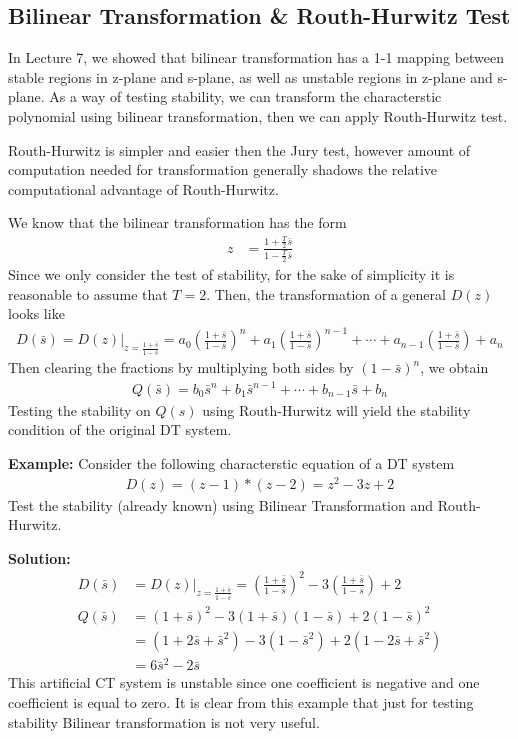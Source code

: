 \documentclass[twoside]{article}
\begin{document}
\subsection*{Bilinear Transformation \& Routh-Hurwitz Test}

In Lecture 7, we showed that bilinear transformation has a 1-1 
mapping between stable regions in z-plane and s-plane, as well as
unstable regions in z-plane and s-plane. As a way of testing
stability, we can transform the characterstic polynomial 
using bilinear transformation, then we can apply Routh-Hurwitz
test. 

Routh-Hurwitz is simpler and easier then the Jury test,
however amount of computation needed for transformation
generally shadows the relative computational advantage of 
Routh-Hurwitz.

We know that the bilinear transformation has the form
%
\begin{align*}
 z &= \frac{1+\frac{T}{2} \bar{s}}{1-\frac{T}{2} \bar{s}}
\end{align*}
%
Since we only consider the test of stability, for the sake of
simplicity it is reasonable to assume that $T = 2$. Then, the
transformation of a general $D(z)$ looks like
%
%
\begin{align*}
D(\bar{s}) = D(z)|_{z = \frac{1+\bar{s}}{1-\bar{s}}} = 
a_0 \left( \frac{1+\bar{s}}{1-\bar{s}} \right)^n + a_1 \left(
  \frac{1+\bar{s}}{1-\bar{s}} \right)^{n-1} 
+ \cdots + a_{n-1} \left( \frac{1+\bar{s}}{1-\bar{s}} \right) + a_n
\end{align*}
% 
Then clearing the fractions by multiplying both sides by $(1 -
\bar{s})^n$, we obtain
%
\begin{align*}
Q(\bar{s}) = b_0 \bar{s}^n + b_1 \bar{s}^{n-1} + \cdots + b_{n-1}
  \bar{s} + b_n
\end{align*}
%
Testing the stability on $Q(s)$ using Routh-Hurwitz will yield
the stability condition of the original DT system. 

\textbf{Example:} Consider the following characterstic equation 
of a DT system
%
\begin{align}
  D(z) = (z-1)*(z-2) = z^2 -3z +2
\end{align}
%
Test the stability (already known) using Bilinear Transformation and 
Routh-Hurwitz.

\textbf{Solution:} 
%
\begin{align*}
D(\bar{s}) &= D(z)|_{z = \frac{1+\bar{s}}{1-\bar{s}}} =
\left( \frac{1+\bar{s}}{1-\bar{s}} \right)^2 - 3 \left(
  \frac{1+\bar{s}}{1-\bar{s}} \right) + 2
\\
Q(\bar{s}) &= \left( 1+\bar{s} \right)^2 - 3 (1+\bar{s} )( 1-\bar{s}) +
  2 \left( 1 - \bar{s} \right)^2
\\
&= (1 + 2 \bar{s} + \bar{s}^2) - 3 (1 - \bar{s}^2 )  + 2 ( 1 - 2
  \bar{s} + \bar{s}^2 )
\\
&= 6 \bar{s}^2 - 2 \bar{s} 
\end{align*}
%
This artificial CT system is unstable since one coefficient
is negative and one coefficient is equal to zero. It is clear
from this example that just for testing stability Bilinear 
transformation is not very useful. 

\end{document}
